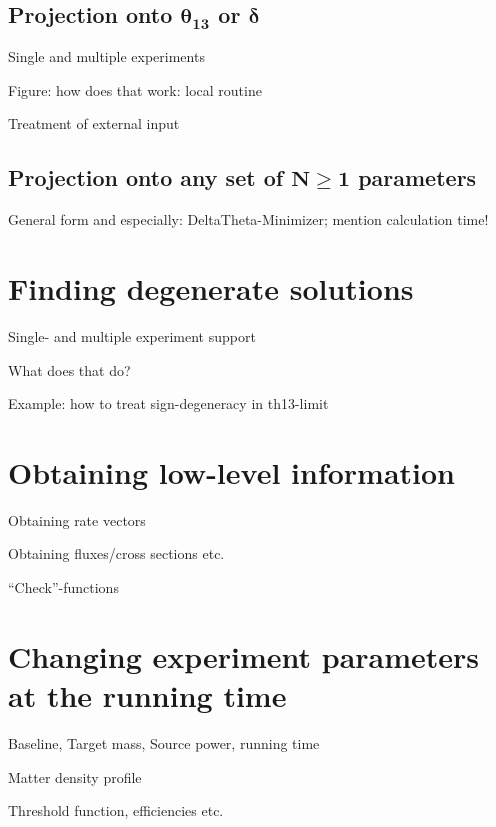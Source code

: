 \section[Projection onto $\theta_{13}$ or $\delta$]{Projection onto $\boldsymbol{\theta_{13}}$ or $\boldsymbol{\delta}$}

\bi
\item
 Single and multiple experiments
\item
 Figure: how does that work: local routine
\item
 Treatment of external input
\ei

\section[Projection onto any set of $N \ge 1$ parameters]{Projection onto any set of $\boldsymbol{N \ge 1}$ parameters}

General form and especially: DeltaTheta-Minimizer; mention calculation time!

\chapter{Finding degenerate solutions}

\bi
\item
 Single- and multiple experiment support
\item
 What does that do?
\item
 Example: how to treat sign-degeneracy in th13-limit
\ei

\chapter{Obtaining low-level information}

\bi
\item
 Obtaining rate vectors
\item
 Obtaining fluxes/cross sections etc.
\item
 ``Check''-functions
\ei

\chapter{Changing experiment parameters at the running time}

\bi
\item
 Baseline, Target mass, Source power, running time
\item
 Matter density profile
\item
 Threshold function, efficiencies etc.
\ei